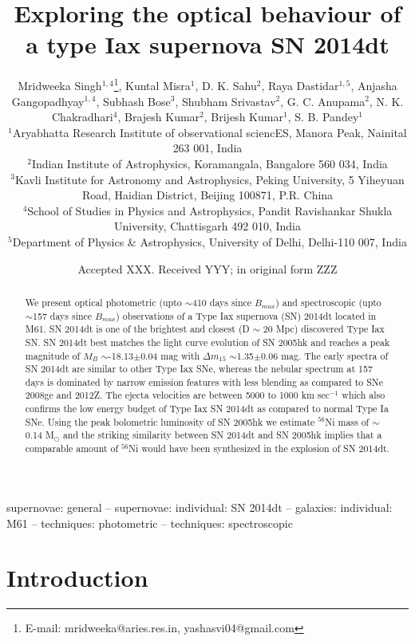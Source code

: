 \documentclass[fleqn,usenatbib]{mnras}
\title[SN 2014dt]{Exploring the optical behaviour of a type Iax supernova SN 2014dt}
\author[Mridweeka Singh et al.]{
Mridweeka Singh$^{1,4}$\thanks{E-mail: mridweeka@aries.res.in, yashasvi04@gmail.com},
Kuntal Misra$^{1}$,
D. K. Sahu$^{2}$,
Raya Dastidar$^{1,5}$,
\newauthor
Anjasha Gangopadhyay$^{1,4}$,
Subhash Bose$^{3}$,
Shubham Srivastav$^{2}$,
G. C. Anupama$^{2}$,
\newauthor
N. K. Chakradhari$^{4}$,
Brajesh Kumar$^{2}$,
Brijesh Kumar$^{1}$,
S. B. Pandey$^{1}$
\\
$^{1}$Aryabhatta Research Institute of observational sciencES, Manora Peak, Nainital 263 001, India\\
$^{2}$Indian Institute of Astrophysics, Koramangala, Bangalore 560 034, India\\
$^{3}$Kavli Institute for Astronomy and Astrophysics, Peking University, 5 Yiheyuan Road, Haidian District, Beijing 100871, P.R. China\\
$^{4}$School of Studies in Physics and Astrophysics, Pandit Ravishankar Shukla University, Chattisgarh 492 010, India \\
$^{5}$Department of Physics \& Astrophysics, University of Delhi, Delhi-110 007, India\\
}
\date{Accepted XXX. Received YYY; in original form ZZZ}
\begin{document}
\label{firstpage}
\pagerange{\pageref{firstpage}--\pageref{lastpage}}
\maketitle

\begin{abstract}


We present optical photometric (upto $\sim$410 days since $B$$_{max}$) and spectroscopic (upto $\sim$157 days since $B$$_{max}$) observations of a Type Iax supernova (SN) 2014dt located in M61. SN 2014dt is one of the brightest and closest (D $\sim$ 20 Mpc) discovered Type Iax SN. SN 2014dt best matches the light curve evolution of SN 2005hk and reaches a peak magnitude of $M$$_B$ $\sim$-18.13$\pm$0.04 mag with $\Delta m_{15}$ $\sim$1.35$\pm 0.06$ mag. The early spectra of SN 2014dt are similar to other Type Iax SNe, whereas the nebular spectrum at 157 days is dominated by narrow emission features with less blending as compared to SNe 2008ge and 2012Z. The ejecta velocities are between 5000 to 1000 km sec$^{-1}$ which also confirms the low energy budget of Type Iax SN 2014dt as compared to normal Type Ia SNe. Using the peak bolometric luminosity of SN 2005hk we estimate $^{56}$Ni mass of $\sim$0.14 M$_{\odot}$ and the striking similarity between SN 2014dt and SN 2005hk implies that a comparable amount of $^{56}$Ni would have been synthesized in the explosion of SN 2014dt.
\end{abstract}

\begin{keywords}
supernovae: general -- supernovae: individual: SN 2014dt --  galaxies: individual: M61 -- techniques: photometric -- techniques: spectroscopic 
\end{keywords}



\section{Introduction}
\end{document}
